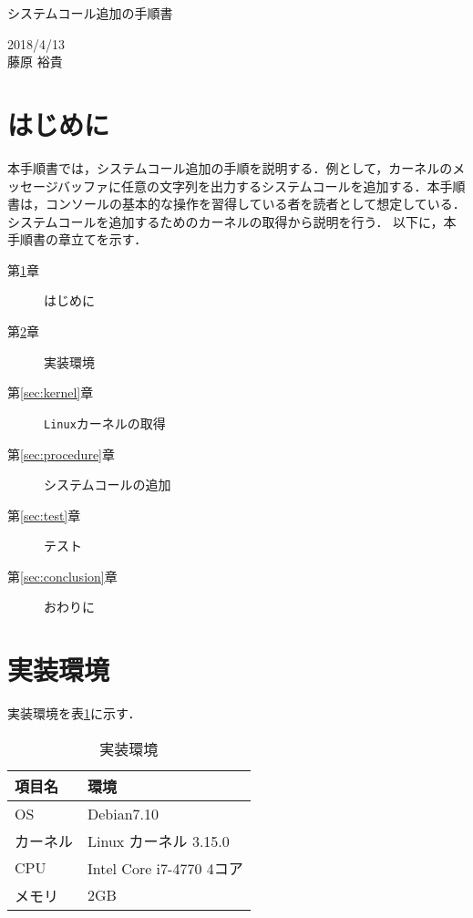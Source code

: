 \documentclass[12pt]{jsarticle}
\begin{document}
\begin{center}
{\LARGE システムコール追加の手順書}
\end{center}

\begin{flushright}
  2018/4/13 \\
 藤原 裕貴
\end{flushright}
\section{はじめに}\label{sec:introduction}
本手順書では，システムコール追加の手順を説明する．例として，カーネルのメッセージバッファに任意の文字列を出力するシステムコールを追加する．本手順書は，コンソールの基本的な操作を習得している者を読者として想定している．システムコールを追加するためのカーネルの取得から説明を行う．
以下に，本手順書の章立てを示す．

\begin{description}
\item [第\ref{sec:introduction}章] はじめに
\item [第\ref{sec:env}章] 実装環境
\item [第\ref{sec:kernel}章] \verb|Linux|カーネルの取得
\item [第\ref{sec:procedure}章] システムコールの追加
\item [第\ref{sec:test}章] テスト
\item [第\ref{sec:conclusion}章] おわりに



\end{description}

\section{実装環境}\label{sec:env}
実装環境を表\ref{tab:env}に示す．

\begin{table}[h]
  \begin{center}
    \caption{実装環境}\label{tab:env}
    \begin{tabular}{l|l}
      \hline\hline
      \multicolumn{1}{l|}{項目名} & \multicolumn{1}{l}{環境} \\
      \hline
      OS & Debian7.10 \\
      カーネル & Linux カーネル 3.15.0 \\
      CPU & Intel Core i7-4770 4コア\\
      メモリ & 2GB \\
      \hline
    \end{tabular}
  \end{center}
\end{table}
\end{document}
